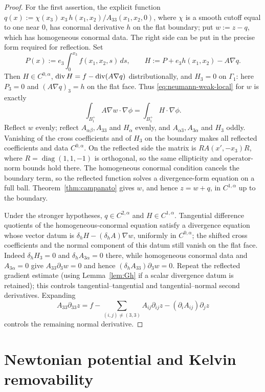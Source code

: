 \begin{proof}
For the first assertion, the explicit function
$q(x):=\chi(x_3)\,x_3\,h(x_1,x_2)/A_{33}(x_1,x_2,0)$, where
$\chi$ is a smooth cutoff equal to one near $0$, has conormal derivative
$h$ on the flat boundary; put $w:=z-q$, which has homogeneous conormal data.
The right side can be put in the precise form required for reflection.  Set
\[
 P(x):=e_3\int_0^{x_3}f(x_1,x_2,s)\,ds,\qquad
 H:=P+e_3h(x_1,x_2)-A\nabla q.
\]
Then $H\in C^{0,\alpha}$,
$\operatorname{div} H=f-\operatorname{div}(A\nabla q)$ distributionally, and
$H_3=0$ on $\Gamma_1$: here $P_3=0$ and
$(A\nabla q)_3=h$ on the flat face.  Thus \eqref{eq:neumann-weak-local} for
$w$ is exactly
\[
 \int_{B_1^+}A\nabla w\cdot\nabla\phi
 =\int_{B_1^+}H\cdot\nabla\phi.
\]
Reflect $w$ evenly; reflect $A_{\alpha\beta},A_{33}$ and $H_\alpha$ evenly,
and $A_{\alpha3},A_{3\alpha}$ and $H_3$ oddly.  Vanishing of the cross
coefficients and of $H_3$ on the boundary makes all reflected coefficients
and data $C^{0,\alpha}$.  On the reflected side the matrix is
$RA(x',-x_3)R$, where $R=\operatorname{diag}(1,1,-1)$ is orthogonal, so the
same ellipticity and operator-norm bounds hold there.  The homogeneous conormal condition cancels the
boundary term, so the reflected function solves a divergence-form equation
on a full ball.  Theorem~\ref{thm:campanato} gives
$w$, and hence $z=w+q$, in $C^{1,\alpha}$ up to the boundary.

Under the stronger hypotheses, $q\in C^{2,\alpha}$ and
$H\in C^{1,\alpha}$.  Tangential difference quotients of the
homogeneous-conormal equation satisfy a divergence equation whose vector
datum is
$\delta_hH-(\delta_hA)\nabla w$, uniformly in $C^{0,\alpha}$; the shifted
cross coefficients and the normal component of this datum still vanish on
the flat face.  Indeed $\delta_hH_3=0$ and
$\delta_hA_{3\alpha}=0$ there, while homogeneous conormal data and
$A_{3\alpha}=0$ give $A_{33}\partial_3w=0$ and hence
$(\delta_hA_{33})\partial_3w=0$.  Repeat the reflected gradient estimate (using
Lemma~\ref{lem:Gh} if a scalar divergence datum is retained); this controls
tangential--tangential and tangential--normal second derivatives.  Expanding
\[
  A_{33}\partial_{33}z
  =f-\!\!\sum_{(i,j)\ne(3,3)}\!\!A_{ij}\partial_{ij}z
   -(\partial_iA_{ij})\partial_jz
\]
controls the remaining normal derivative.
\end{proof}

\section{Newtonian potential and Kelvin removability}\label{sec:newtonian}


